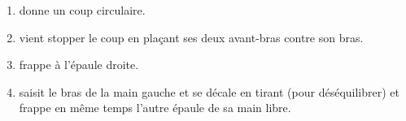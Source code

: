 \begin{exercice}

\begin{enumerate}
	\item \A donne un coup circulaire.
	
	\item \D vient stopper le coup en plaçant ses deux avant-bras contre son bras.
	
	\item \D frappe à l'épaule droite.
	
	\item \D saisit le bras de la main gauche et se décale en tirant (pour déséquilibrer) et frappe en même temps l'autre épaule de sa main libre.
\end{enumerate}
\end{exercice}
